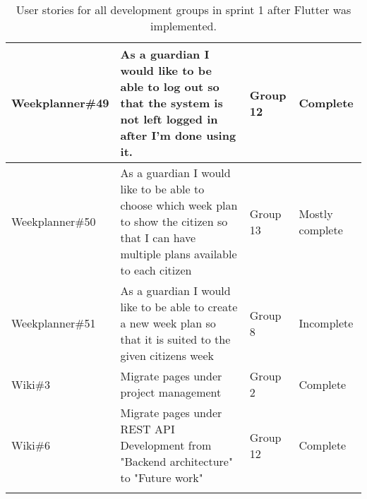 \begin{longtable}{|p{2.8cm}|p{7cm}|p{1.6cm}|p{2cm}|}
    Weekplanner\#49 & As a guardian I would like to be able to log out so that the system is not left logged in after I’m done using it.                                                       & Group 12        & Complete     \\ \hline
    Weekplanner\#50 & As a guardian I would like to be able to choose which week plan to show the citizen so that I can have multiple plans available to each citizen                          & Group 13        & Mostly complete     \\ \hline
    Weekplanner\#51 & As a guardian I would like to be able to create a new week plan so that it is suited to the given citizens week                                                          & Group 8         & Incomplete    \\ \hline
    Wiki\#3         & Migrate pages under project management                                                                                                                                   & Group 2         & Complete    \\ \hline
    Wiki\#6         & Migrate pages under REST API Development from "Backend architecture" to "Future work"                                                                                    & Group 12        & Complete    \\ \hline
   \caption{User stories for all development groups in sprint 1 after Flutter was implemented.}\label{table:user-stories-sprint-1-review}
\end{longtable}

